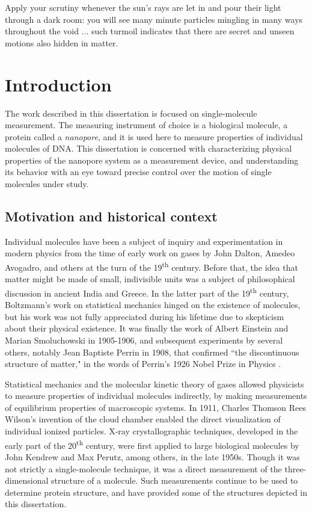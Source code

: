 \begin{savequote}[75mm]
Apply your scrutiny whenever the sun's rays are let in and pour their light through a dark room: you will see many minute particles mingling in many ways throughout the void ... such turmoil indicates that there are secret and unseen motions also hidden in matter.
\end{savequote}

\chapter{Introduction}
\label{introduction}

The work described in this dissertation is focused on single-molecule measurement.  The measuring instrument of choice is a biological molecule, a protein called a \textit{nanopore}, and it is used here to measure properties of individual molecules of DNA.  This dissertation is concerned with characterizing physical properties of the nanopore system as a measurement device, and understanding its behavior with an eye toward precise control over the motion of single molecules under study.

\section{Motivation and historical context}

Individual molecules have been a subject of inquiry and experimentation in modern physics from the time of early work on gases by John Dalton, Amedeo Avogadro, and others at the turn of the 19\textsuperscript{th} century.  Before that, the idea that matter might be made of small, indivisible units was a subject of philosophical discussion in ancient India and Greece.  In the latter part of the 19\textsuperscript{th} century, Boltzmann's work on statistical mechanics hinged on the existence of molecules, but his work was not fully appreciated during his lifetime due to skepticism about their physical existence.  It was finally the work of Albert Einstein and Marian Smoluchowski in 1905-1906, and subsequent experiments by several others, notably Jean Baptiste Perrin in 1908, that confirmed ``the discontinuous structure of matter," in the words of Perrin's 1926 Nobel Prize in Physics \citep{Nobel1926}.

Statistical mechanics and the molecular kinetic theory of gases allowed physicists to measure properties of individual molecules indirectly, by making measurements of equilibrium properties of macroscopic systems.  In 1911, Charles Thomson Rees Wilson's invention of the cloud chamber enabled the direct visualization of individual ionized particles.  X-ray crystallographic techniques, developed in the early part of the 20\textsuperscript{th} century, were first applied to large biological molecules by John Kendrew \citep{Kendrew1958} and Max Perutz, among others, in the late 1950s.  Though it was not strictly a single-molecule technique, it was a direct measurement of the three-dimensional structure of a molecule.  Such measurements continue to be used to determine protein structure, and have provided some of the structures depicted in this dissertation.

